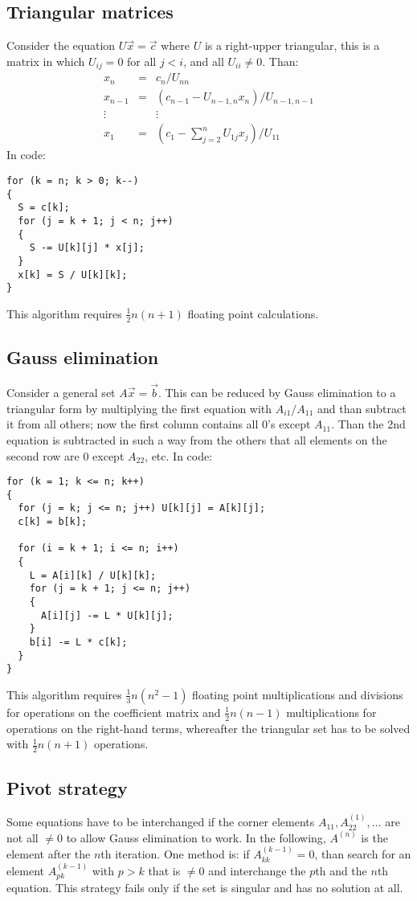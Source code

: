 \subsection{Triangular matrices}
Consider the equation $U\vec{x}=\vec{c}$ where $U$ is a right-upper triangular,
this is a matrix in which $U_{ij}=0$ for all $j<i$, and all $U_{ii}\neq0$. Than:
\begin{eqnarray*}
x_n    &=&c_n/U_{nn}\\
x_{n-1}&=&(c_{n-1}-U_{n-1,n}x_n)/U_{n-1,n-1}\\
\vdots & &\vdots\\
x_1    &=&(c_1-\sum_{j=2}^nU_{1j}x_j)/U_{11}
\end{eqnarray*}
In code:
\begin{verbatim}
for (k = n; k > 0; k--)
{
  S = c[k];
  for (j = k + 1; j < n; j++)
  {
    S -= U[k][j] * x[j];
  }
  x[k] = S / U[k][k];
}
\end{verbatim}
This algorithm requires $\frac{1}{2}n(n+1)$ floating point calculations.

\subsection{Gauss elimination}
Consider a general set $A\vec{x}=\vec{b}$. This can be reduced by Gauss
elimination to a triangular form by multiplying the first equation with
$A_{i1}/A_{11}$ and than subtract it from all others; now the first column
contains all 0's except $A_{11}$. Than the 2nd equation is subtracted in
such a way from the others that all elements on the second row are 0 except
$A_{22}$, etc. In code:
\begin{verbatim}
for (k = 1; k <= n; k++)
{
  for (j = k; j <= n; j++) U[k][j] = A[k][j];
  c[k] = b[k];

  for (i = k + 1; i <= n; i++)
  {
    L = A[i][k] / U[k][k];
    for (j = k + 1; j <= n; j++)
    {
      A[i][j] -= L * U[k][j];
    }
    b[i] -= L * c[k];
  }
}
\end{verbatim}
This algorithm requires $\frac{1}{3}n(n^2-1)$ floating point multiplications
and divisions for operations on the coefficient matrix and $\frac{1}{2}n(n-1)$
multiplications for operations on the right-hand terms, whereafter the
triangular set has to be solved with $\frac{1}{2}n(n+1)$ operations.

\subsection{Pivot strategy}
Some equations have to be interchanged if the corner elements
$A_{11}, A^{(1)}_{22},...$ are not all $\neq0$ to allow Gauss elimination to
work. In the following, $A^{(n)}$ is the element after the $n$th iteration.
One method is: if $A^{(k-1)}_{kk}=0$, than search for an element $A^{(k-1)}_{pk}$
with $p>k$ that is $\neq0$ and interchange the $p$th and the $n$th equation. This
strategy fails only if the set is singular and has no solution at all.

